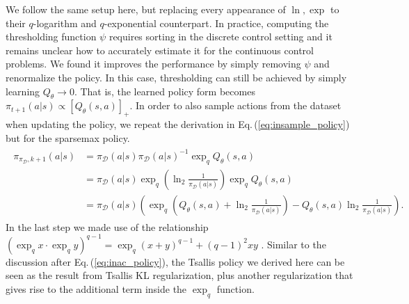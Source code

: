 \documentclass{article}
\newcommand{\AdaBracket}[1]{\left(#1\right)}
\newcommand{\AdaRectBracket}[1]{\left[#1\right]}
\newcommand{\qlog}{$q$-logarithm }
\newcommand{\expq}[1]{\exp_{q}\!#1}
\newcommand{\eq}[1]{Eq.\,(#1)}
\newcommand{\datasetPolicy}{\pi_{\mathcal{D}}}
\begin{document}
We follow the same setup here, but replacing every appearance of $\ln, \exp$ to their \qlog and $q$-exponential counterpart.
In practice, computing the thresholding function $\psi$ requires sorting in the discrete control setting and it remains unclear how to accurately estimate it for the continuous control problems.
We found it improves the performance by simply removing $\psi$ and renormalize the policy.
In this case, thresholding can still be achieved by simply learning $Q_{\theta} \rightarrow 0$.
That is, the learned policy form becomes $\pi_{t+1}(a|s) \propto \AdaRectBracket{Q_{\theta}(s,a)}_{+}$.
In order to also sample actions from the dataset when updating the policy, we repeat the derivation in \eq{\ref{eq:insample_policy}} but for the sparsemax policy.
\begin{align}
    \begin{split}
        \pi_{\datasetPolicy, k+1} (a|s) &= \datasetPolicy(a|s) \datasetPolicy(a|s)^{-1} \exp_q{Q_{\theta}(s,a)} \\
        &= \datasetPolicy(a|s)  \exp_q{\AdaBracket{\ln_2{\frac{1}{\datasetPolicy(a|s)}}}} \exp_q{Q_{\theta}(s,a)}\\
        &=  \datasetPolicy(a|s) \AdaBracket{ \exp_q\AdaBracket{Q_{\theta}(s,a) + \ln_2\frac{1}{\datasetPolicy(a|s)}} -  Q_{\theta}(s,a)  \ln_2{\frac{1}{\datasetPolicy(a|s)}} }.
        \label{eq:tsallis_inac_policy}
    \end{split}
\end{align}
In the last step we made use of the relationship $\AdaBracket{\expq{x}\cdot \expq{y}}^{q-1} = \expq{\AdaBracket{x+y}}^{q-1} + (q-1)^2 xy$ \cite{Yamano2004-properties-qlogexp}.
Similar to the discussion after \eq{\ref{eq:inac_policy}}, the Tsallis policy we derived here can be seen as the result from Tsallis KL regularization, plus another regularization that gives rise to the additional term inside the $\exp_q$ function.

\end{document}

